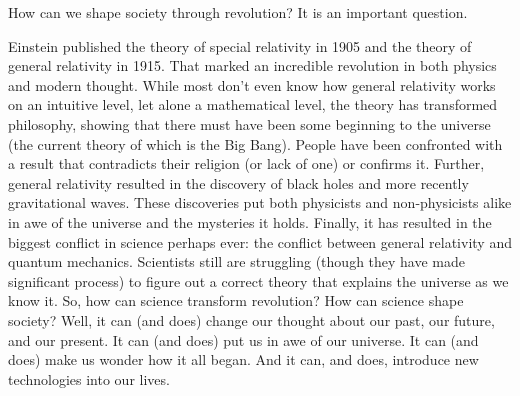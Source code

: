 How can we shape society through revolution? It is an important question.

Einstein published the theory of special relativity in 1905 and the theory of general relativity in 1915. 
That marked an incredible revolution in both physics and modern thought. 
While most don’t even know how general relativity works on an intuitive level, let alone a mathematical level, 
the theory has transformed philosophy, showing that there must have been some beginning to the universe 
(the current theory of which is the Big Bang). 
People have been confronted with a result that contradicts their religion (or lack of one) or confirms it. 
Further, general relativity resulted in the discovery of black holes and more recently gravitational waves. 
These discoveries put both physicists and non-physicists alike in awe of the universe and the mysteries it holds. 
Finally, it has resulted in the biggest conflict in science perhaps ever: the conflict between general relativity and quantum mechanics. 
Scientists still are struggling (though they have made significant process) to figure out a correct theory 
that explains the universe as we know it. So, how can science transform revolution? How can science shape society?
Well, it can (and does) change our thought about our past, our future, and our present. 
It can (and does) put us in awe of our universe. It can (and does) make us wonder how it all began. 
And it can, and does, introduce new technologies into our lives.
